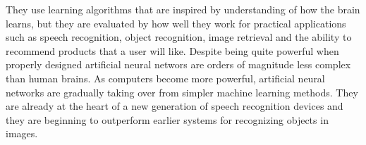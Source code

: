 They use learning algorithms that are inspired by understanding of how the brain learns, but they are evaluated by how well they work for practical applications such as speech recognition, object recognition, image retrieval and the ability to recommend products that a user will like.
Despite being quite powerful when properly designed artificial neural networs are orders of magnitude less complex than human brains.
As computers become more powerful, artificial neural networks are gradually taking over from simpler machine learning methods.
They are already at the heart of a new generation of speech recognition devices and they are beginning to outperform earlier systems for recognizing objects in images.

\vspace*{5em}

